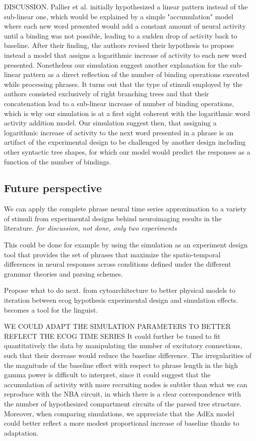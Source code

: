 \documentclass[10pt]{article}
\begin{document}
DISCUSSION. Pallier et al. initially hypothesized a linear pattern instead of the sub-linear one, which would be explained by a simple "accumulation" model where each new word presented would add a constant amount of neural activity until a binding was not possible, leading to a sudden drop of activity back to baseline.
After their finding, the authors revised their hypothesis to propose instead a model that assigns a logarithmic increase of activity to each new word presented.
Nonetheless our simulation suggest another explanation for the sub-linear pattern as a direct reflection of the number of binding operations executed while processing phrases.
It turns out that the type of stimuli employed by the authors consisted exclusively of right branching trees and that their concatenation lead to a sub-linear increase of number of binding operations, which is why our simulation is at a first sight coherent with the logarithmic word activity addition model.
Our simulation suggest then, that assigning a logarithmic increase of activity to the next word presented in a phrase is an artifact of the experimental design to be challenged by another design including other syntactic tree shapes, for which our model would predict the responses as a function of the number of bindings.




\subsection{Future perspective}



We can apply the complete phrase neural time series approximation to a variety of stimuli from experimental designs behind neuroimaging results in the literature. \emph{for discussion, not done, only two experiments}

This could be done for example by using the simulation as an experiment design tool that provides the set of phrases that maximize the spatio-temporal differences in neural responses across conditions defined under the different grammar theories and parsing schemes.

Propose what to do next. from cytoarchitecture to better physical models to iteration between ecog hypothesis experimental design and simulation effects. becomes a tool for the linguist.


WE COULD ADAPT THE SIMULATION PARAMETERS TO BETTER REFLECT THE ECOG TIME SERIES
It could further be tuned to fit quantitatively the data by manipulating the number of excitatory connections, such that their decrease would reduce the baseline difference.
The irregularities of the magnitude of the baseline effect with respect to phrase length in the high gamma power is difficult to interpret, since it could suggest that the accumulation of activity with more recruiting nodes is subtler than what we can reproduce with the NBA circuit, in which there is a clear correspondence with the number of hypothesized compartment circuits of the parsed tree structure.
Moreover, when comparing simulations, we appreciate that the AdEx model could better reflect a more modest proportional increase of baseline thanks to adaptation.~
\end{document}

